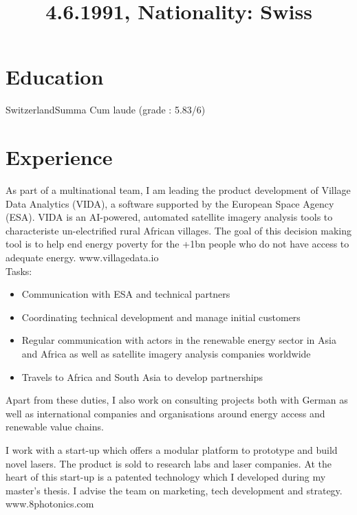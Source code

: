 \documentclass[11pt,a4paper,sans]{moderncv} %
\title{4.6.1991, Nationality: Swiss}
\begin{document}
\makecvtitle

\section{Education}
{Switzerland}{Summa Cum laude (grade : 5.83/6)}

\section{Experience}

{As part of a multinational team, I am leading the product development of Village Data Analytics (VIDA), a software supported by the European Space Agency (ESA). VIDA is an AI-powered, automated satellite imagery analysis tools to characteriste un-electrified rural African villages. The goal of this decision making tool is to help end energy poverty for the +1bn people who do not have access to adequate energy. www.villagedata.io\\
Tasks:
\begin{itemize}
\item Communication with ESA and technical partners
\item Coordinating technical development and manage initial customers
\item Regular communication with actors in the renewable energy sector in Asia and Africa as well as satellite imagery analysis companies worldwide
\item Travels to Africa and South Asia to develop partnerships
\end{itemize}
Apart from these duties, I also work on consulting projects both with German as well as international companies and organisations around energy access and renewable value chains.
}

{I work with a start-up which offers a modular platform to prototype and build novel lasers. The product is sold to research labs and laser companies. At the heart of this start-up is a patented technology which I developed during my master's thesis. I advise the team on marketing, tech development and strategy. www.8photonics.com \\
}
\end{document}
